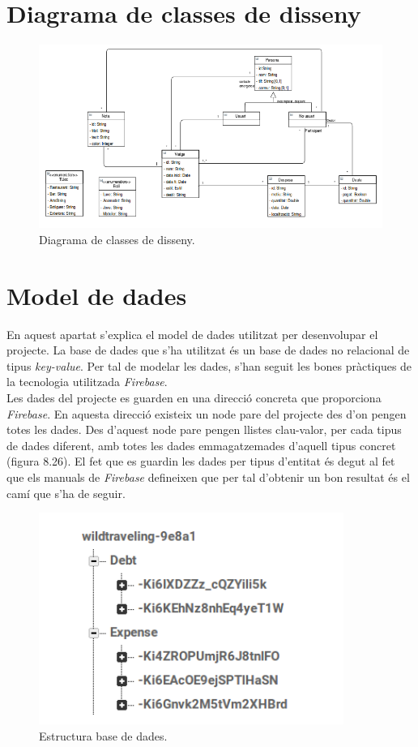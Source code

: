 \section{Diagrama de classes de disseny}

\begin{figure}[!h]
\centering
\includegraphics[scale=0.80]{Figures/classesDisseny.png}
\caption{Diagrama de classes de disseny.}
\end{figure}

\section{Model de dades}

En aquest apartat s'explica el model de dades utilitzat per desenvolupar el projecte. La base de dades que s'ha utilitzat és un base de dades no relacional de tipus \textit{key-value}. Per tal de modelar les dades, s'han seguit les bones pràctiques de la tecnologia utilitzada \textit{Firebase}.\\

Les dades del projecte es guarden en una direcció concreta que proporciona \textit{Firebase}. En aquesta direcció existeix un node pare del projecte des d'on pengen totes les dades. Des d'aquest node pare pengen llistes clau-valor, per cada tipus de dades diferent, amb totes les dades emmagatzemades d'aquell tipus concret (figura 8.26). El fet que es guardin les dades per tipus d'entitat és degut al fet que els manuals de \textit{Firebase} defineixen que per tal d'obtenir un bon resultat és el camí que s'ha de seguir.

\begin{figure}[!h]
\centering
\includegraphics[scale=1.00]{Figures/EstructuraBD.jpg}
\caption{Estructura base de dades.}
\end{figure}

